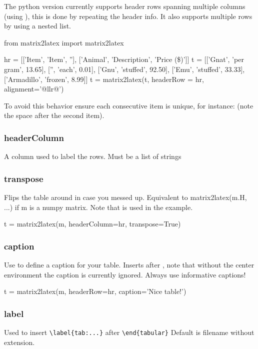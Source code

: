 The python version currently supports header rows spanning multiple columns (using ), this
is done by repeating the header info. It also supports multiple rows 
by using a nested list.
\begin{pycode}[multi]
from matrix2latex import matrix2latex
\end{pycode}
\begin{pyblock}[multi]
hr = [['Item', 'Item', ''],
      ['Animal', 'Description', 'Price (\$)']]
t = [['Gnat', 'per gram', 13.65],
     ['', 'each',  0.01],
     ['Gnu', 'stuffed', 92.50],
     ['Emu', 'stuffed', 33.33],
     ['Armadillo', 'frozen', 8.99]]
t = matrix2latex(t, headerRow = hr, alignment='@{}llr@{}')
\end{pyblock}
To avoid this behavior ensure each consecutive item is unique, for instance:
(note the space after the second item).

\subsubsection{headerColumn}
    A column used to label the rows.
    Must be a list of strings
\subsubsection{transpose}
Flips the table around in case you messed up. Equivalent to
matrix2latex(m.H, ...)
if m is a numpy matrix.
Note that  is used in the example.
\begin{pyblock}
t = matrix2latex(m, headerColumn=hr, transpose=True)
\end{pyblock}

\subsubsection{caption}
Use to define a caption for your table.
Inserts  after ,
note that without the center environment the caption is currently ignored.
Always use informative captions!
\begin{pyblock}
t = matrix2latex(m, headerRow=hr,
                 caption='Nice table!')
\end{pyblock}

\subsubsection{label}
Used to insert \verb!\label{tab:...}! after \verb!\end{tabular}!
Default is filename without extension.

